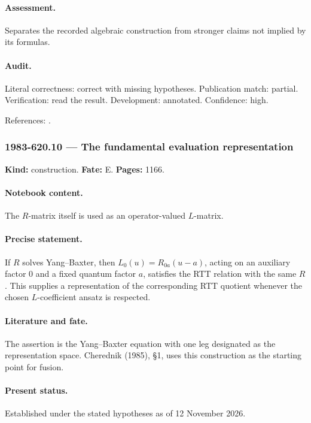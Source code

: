 \paragraph{Assessment.} Separates the recorded algebraic construction from stronger claims not implied by its formulas.

\paragraph{Audit.} Literal correctness: correct with missing hypotheses. Publication match: partial. Verification: read the result. Development: annotated. Confidence: high.

\noindent References: \citep{sklyanin1982algebraic}.\par

\subsubsection{1983-620.10 --- The fundamental evaluation representation}

\label{item:1983-620.10}

\noindent\textbf{Kind:} construction. \textbf{Fate:} E. \textbf{Pages:} 1166.\par

\paragraph{Notebook content.} The \(R\)-matrix itself is used as an operator-valued \(L\)-matrix.

\paragraph{Precise statement.} If \(R\) solves Yang–Baxter, then \(L_0(u)=R_{0a}(u-a)\), acting on an auxiliary factor \(0\) and a fixed quantum factor \(a\), satisfies the RTT relation with the same \(R\). This supplies a representation of the corresponding RTT quotient whenever the chosen \(L\)-coefficient ansatz is respected.

\paragraph{Literature and fate.} The assertion is the Yang–Baxter equation with one leg designated as the representation space. Cherednik (1985), \S1, uses this construction as the starting point for fusion.

\paragraph{Present status.} Established under the stated hypotheses as of 12 November 2026.

